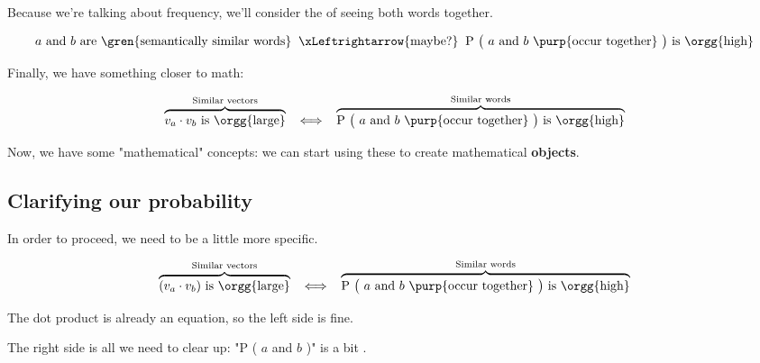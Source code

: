         Because we're talking about frequency, we'll consider the  of seeing both words together.

        \begin{equation*}
            \text{$a$ and $b$ are \gren{semantically similar words}}
            \;\;\xLeftrightarrow{\text{maybe?}}\;\; 
            \text{P \big( $a$ and $b$ \purp{occur together} \big) is \orgg{high}}
        \end{equation*}

        Finally, we have something closer to math:

        \begin{equation*}
            \overbrace{
                v_a \cdot v_b \text{ is \orgg{large}}}
            ^{\text{Similar vectors}}
            \;\;\iff\;\; 
            \overbrace{
                \text{P \big( $a$ and $b$ \purp{occur together} \big) is \orgg{high}}}
            ^{\text{Similar words}}
        \end{equation*}

        Now, we have some "mathematical" concepts: we can start using these to create mathematical \textbf{objects}.


    \phantom{}
    
    \subsection{Clarifying our probability}

        In order to proceed, we need to be a little more specific.

        \begin{equation*}
            \overbrace{
                (v_a \cdot v_b) \text{ is \orgg{large}}}
            ^{\text{Similar vectors}}
            \;\;\iff\;\; 
            \overbrace{
                \text{P \big( $a$ and $b$ \purp{occur together} \big) is \orgg{high}}}
            ^{\text{Similar words}}
        \end{equation*}

        
        The dot product is already an equation, so the left side is fine.

        \phantom{}
        
        The right side is all we need to clear up: "P \big( $a$ and $b$  \big)" is a bit . 
        

